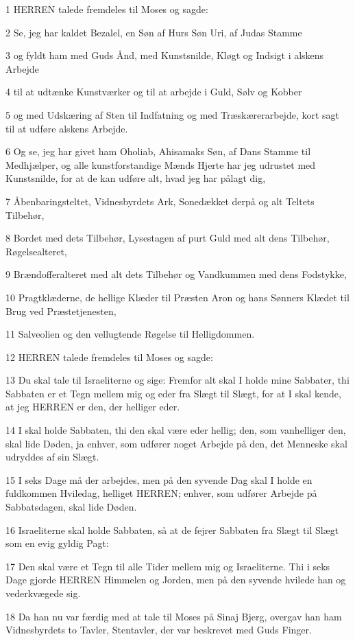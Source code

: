 \par 1 HERREN talede fremdeles til Moses og sagde:
\par 2 Se, jeg har kaldet Bezalel, en Søn af Hurs Søn Uri, af Judas Stamme
\par 3 og fyldt ham med Guds Ånd, med Kunstsnilde, Kløgt og Indsigt i alskens Arbejde
\par 4 til at udtænke Kunstværker og til at arbejde i Guld, Sølv og Kobber
\par 5 og med Udskæring af Sten til Indfatning og med Træskærerarbejde, kort sagt til at udføre alskens Arbejde.
\par 6 Og se, jeg har givet ham Oholiab, Ahisamaks Søn, af Dans Stamme til Medhjælper, og alle kunstforstandige Mænds Hjerte har jeg udrustet med Kunstsnilde, for at de kan udføre alt, hvad jeg har pålagt dig,
\par 7 Åbenbaringsteltet, Vidnesbyrdets Ark, Sonedækket derpå og alt Teltets Tilbehør,
\par 8 Bordet med dets Tilbehør, Lysestagen af purt Guld med alt dens Tilbehør, Røgelsealteret,
\par 9 Brændofferalteret med alt dets Tilbehør og Vandkummen med dens Fodstykke,
\par 10 Pragtklæderne, de hellige Klæder til Præsten Aron og hans Sønners Klædet til Brug ved Præstetjenesten,
\par 11 Salveolien og den vellugtende Røgelse til Helligdommen.
\par 12 HERREN talede fremdeles til Moses og sagde:
\par 13 Du skal tale til Israeliterne og sige: Fremfor alt skal I holde mine Sabbater, thi Sabbaten er et Tegn mellem mig og eder fra Slægt til Slægt, for at I skal kende, at jeg HERREN er den, der helliger eder.
\par 14 I skal holde Sabbaten, thi den skal være eder hellig; den, som vanhelliger den, skal lide Døden, ja enhver, som udfører noget Arbejde på den, det Menneske skal udryddes af sin Slægt.
\par 15 I seks Dage må der arbejdes, men på den syvende Dag skal I holde en fuldkommen Hviledag, helliget HERREN; enhver, som udfører Arbejde på Sabbatsdagen, skal lide Døden.
\par 16 Israeliterne skal holde Sabbaten, så at de fejrer Sabbaten fra Slægt til Slægt som en evig gyldig Pagt:
\par 17 Den skal være et Tegn til alle Tider mellem mig og Israeliterne. Thi i seks Dage gjorde HERREN Himmelen og Jorden, men på den syvende hvilede han og vederkvægede sig.
\par 18 Da han nu var færdig med at tale til Moses på Sinaj Bjerg, overgav han ham Vidnesbyrdets to Tavler, Stentavler, der var beskrevet med Guds Finger.

